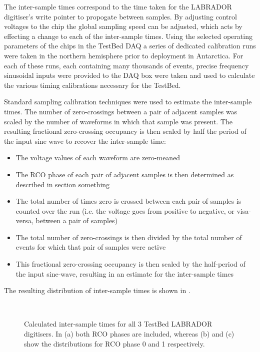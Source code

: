 The inter-sample times correspond to the time taken for the LABRADOR digitiser's write pointer to propogate between samples. By adjusting control voltages to the chip the global sampling speed can be adjusted, which acts by effecting a change to each of the inter-sample times. Using the selected operating parameters of the chips in the TestBed DAQ a series of dedicated calibration runs were taken in the northern hemisphere prior to deployment in Antarctica. For each of these runs, each containing many thousands of events,  precise frequency sinusoidal inputs were provided to the DAQ box were taken and used to calculate the various timing calibrations necessary for the TestBed. 

Standard sampling calibration techniques were used to estimate the inter-sample times. The number of zero-crossings between a pair of adjacent samples was scaled by the number of waveforms in which that sample was present. The resulting fractional zero-crossing occupancy is then scaled by half the period of the input sine wave to recover the inter-sample time:

\begin{itemize}
\item The voltage values of each waveform are zero-meaned 
\item The RCO phase of each pair of adjacent samples is then determined as described in section something %
\item The total number of times zero is crossed between each pair of samples is counted over the run (i.e. the voltage goes from positive to negative, or visa-versa, between a pair of samples)
\item The total number of zero-crossings is then divided by the total number of events for which that pair of samples were active
\item This fractional zero-crossing occupancy is then scaled by the half-period of the input sine-wave, resulting in an estimate for the inter-sample times
\end{itemize}


The resulting distribution of inter-sample times is shown in . 

\begin{figure}[htpb]
  \\
  \hfill
  \caption{Calculated inter-sample times for all 3 TestBed LABRADOR digitisers. In (a) both RCO phases are included, whereas (b) and (c) show the distributions for RCO phase 0 and 1 respectively.}
  \label{fig:calibration:LABRADOR-Digitiser-Chip:Inter-sample-times}
\end{figure}

